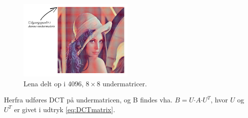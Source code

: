 \begin{figure}[htbp]
\centering
\includegraphics[width=0.5\textwidth]{billeder/lena-grid.png}
\caption{Lena delt op i 4096, $8 \times 8$ undermatricer.}
\label{fig:lena-grid-8x8}
\end{figure}
Herfra udføres DCT på undermatricen, og B findes vha. $B = U \boldsymbol{\cdot} A \boldsymbol{\cdot} U^T$, hvor $U$ og $U^T$ er givet i udtryk \vref{eq:DCTmatrix}.
